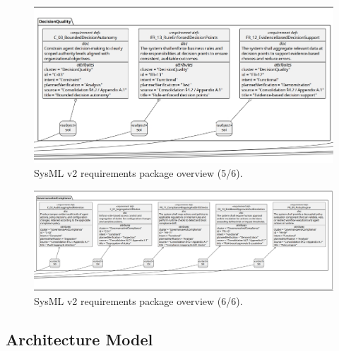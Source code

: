\begin{figure}[htbp]
  \centering
  \includegraphics[width=\linewidth]{ressources/MAS/figures/MASRequirements/MASRequirements5.jpeg}
  \caption{SysML v2 requirements package overview (5/6).}
  \label{fig:mas-reqs-5}
\end{figure}
\begin{figure}[htbp]
  \centering
  \includegraphics[width=\linewidth]{ressources/MAS/figures/MASRequirements/MASRequirements6.jpeg}
  \caption{SysML v2 requirements package overview (6/6).}
  \label{fig:mas-reqs-6}
\end{figure}

\clearpage


\clearpage
\subsection*{Architecture Model}\label{app:arch-mod}

